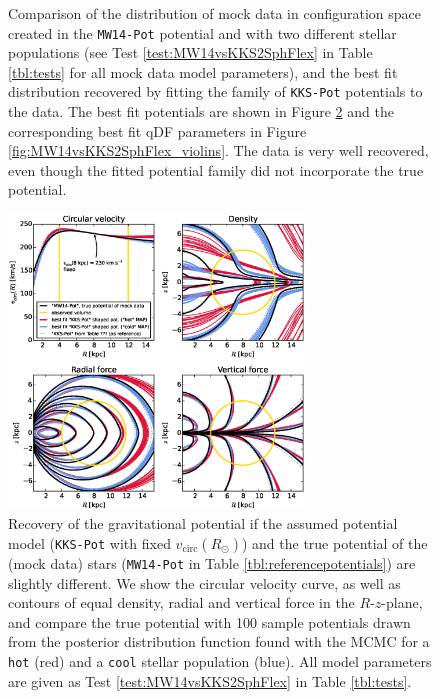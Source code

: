 
\begin{figure}[!htbp]
\caption{Comparison of the distribution of mock data in configuration space created in the \texttt{MW14-Pot} potential and with two different stellar populations (see Test \ref{test:MW14vsKKS2SphFlex} in Table \ref{tbl:tests} for all mock data model parameters), and the best fit distribution recovered by fitting the family of \texttt{KKS-Pot} potentials to the data. The best fit potentials are shown in Figure \ref{fig:MW14vsKKS2SphFlex} and the corresponding best fit qDF parameters in Figure \ref{fig:MW14vsKKS2SphFlex_violins}. The data is very well recovered, even though the fitted potential family did not incorporate the true potential.}
\label{fig:MW14vsKKS2SphFlex_mockdata_residuals}
\end{figure}

\begin{figure}[!htbp]
\centering
\includegraphics[width=0.7\textwidth]{figs/MW14vsKKS2SphFlex_contours_compare.eps}
\caption{Recovery of the gravitational potential if the assumed potential model (\texttt{KKS-Pot} with fixed $v_\text{circ}(R_\odot)$) and the true potential of the (mock data) stars (\texttt{MW14-Pot} in Table \ref{tbl:referencepotentials}) are slightly different. We show the circular velocity curve, as well as contours of equal density, radial and vertical force in the $R$-$z$-plane, and compare the true potential with 100 sample potentials drawn from the posterior distribution function found with the MCMC for a \texttt{hot} (red) and a \texttt{cool} stellar population (blue). All model parameters are given as Test \ref{test:MW14vsKKS2SphFlex} in Table \ref{tbl:tests}. }
\label{fig:MW14vsKKS2SphFlex}
\end{figure}

